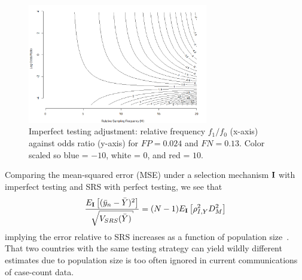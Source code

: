 \documentclass[11pt]{amsart}
\numberwithin{equation}{section}
\theoremstyle{plain}
\def\I{\bf I}
\begin{document}
 \begin{figure}[!th]
 \centering
 \includegraphics[width = 0.7\textwidth]{../figs/mem_heatmap.png}
 \caption{Imperfect testing adjustment: relative frequency $f_1/f_0$ (x-axis) against odds ratio (y-axis) for $FP=0.024$ and $FN=0.13$. Color scaled so blue = $-10$, white = $0$, and red = $10$.}
 \label{fig:heatmap}
 \vspace{-0.3cm}
 \end{figure}

 Comparing the mean-squared error (MSE) under a selection mechanism $\I$ with imperfect testing and SRS with perfect testing, we see that
 $$
 \frac{E_{\I} \left[ (\bar y_n - \bar Y)^2 \right]}{\sqrt{V_{SRS} (\bar Y)}} = (N-1) E_{\I} \left[ \rho_{I,Y}^2 D_M^2 \right]
 $$
 implying the error relative to SRS increases as a function of population size~\citep{Meng2018}. That two countries with the same testing strategy can yield wildly different estimates due to population size is too often ignored in current communications of case-count data.
\end{document}
